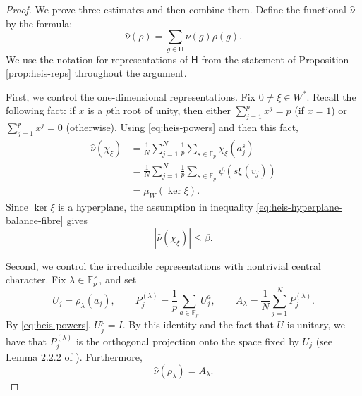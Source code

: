 \documentclass[11pt, reqno]{amsart}
\numberwithin{equation}{section}
\newcommand{\Fp}{\mathbb F_p}
\newcommand{\Heis}{\mathsf H}
\begin{document}
\begin{proof}
We prove three estimates and then combine them. Define the functional $\widehat \nu$ by the formula:
\[
\widehat\nu(\rho)=\sum_{g\in\Heis}\nu(g)\rho(g).
\]
We use the notation for representations of $\Heis$ from the statement of Proposition \ref{prop:heis-reps} throughout the argument.

First, we control the one-dimensional representations.  Fix
\(0\ne\xi\in W^*\). Recall the following fact: if $x$ is a \(p\)th root of unity, then either $\sum_{j=1}^{p} x^{j} = p$ (if $x=1$) or   $\sum_{j=1}^{p} x^{j} = 0$ (otherwise). Using \eqref{eq:heis-powers} and then this fact, 
\[
\begin{aligned}
    \widehat\nu(\chi_\xi)
    &=\frac1N\sum_{j=1}^N\frac1p\sum_{s\in\Fp}\chi_\xi(a_j^s)\\
    &=\frac1N\sum_{j=1}^N\frac1p\sum_{s\in\Fp}\psi(s\xi(v_j))\\
    &=\mu_W(\ker \xi).
\end{aligned}
\]
Since \(\ker\xi\) is a hyperplane, the assumption in inequality \eqref{eq:heis-hyperplane-balance-fibre}
gives
\begin{equation} \label{IneqRepBound1}
    |\widehat\nu(\chi_\xi)|\le \beta .
\end{equation}

Second, we control the irreducible representations with nontrivial central
character.  Fix \(\lambda\in\Fp^\times\), and set
\[
    U_j=\rho_\lambda(a_j),\qquad
    P_j^{(\lambda)}=\frac1p\sum_{a\in\Fp}U_j^a,
    \qquad
    A_\lambda=\frac1N\sum_{j=1}^N P_j^{(\lambda)} .
\]
By \eqref{eq:heis-powers}, \(U_j^p=I\). By this identity and the fact that $U$ is unitary, we have that \(P_j^{(\lambda)}\) is the
orthogonal projection onto the space fixed by \(U_j\) (see Lemma 2.2.2 of \cite{Sturmfels2008Algorithms}). Furthermore,
\[
    \widehat\nu(\rho_\lambda)=A_\lambda.
\]


\end{proof}
\end{document}

